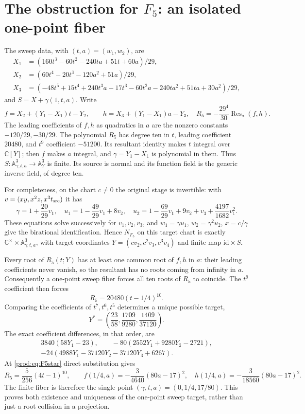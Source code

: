 \documentclass[11pt]{article}
\numberwithin{equation}{section}
\theoremstyle{plain}
\theoremstyle{definition}
\theoremstyle{remark}
\newcommand{\C}{\mathbb{C}}
\newcommand{\A}{\mathbb{A}}
\newcommand{\id}{\mathrm{id}}
\begin{document}
\section{The obstruction for \texorpdfstring{$F_5$}{F5}: an isolated one-point fiber}\label{prod:sec:F5}
The sweep data, with $(t,a)=(w_1,w_2)$, are
\begin{align*}
 X_1&=(160t^3-60t^2-240ta+51t+60a)/29,\\
 X_2&=(60t^4-20t^3-120a^2+51a)/29,\\
 X_3&=(-48t^5+15t^4+240t^3a-17t^3-60t^2a
       -240ta^2+51ta+30a^2)/29,
\end{align*}
and $S=X+\gamma(1,t,a)$. Write
\[
 f=X_2+(Y_1-X_1)t-Y_2,\qquad
 h=X_3+(Y_1-X_1)a-Y_3,
 \quad R_5=-\frac{29^4}{30}\operatorname{Res}_a(f,h).
\]
The leading coefficients of $f,h$ as quadratics in $a$ are the nonzero
constants $-120/29,-30/29$. The polynomial $R_5$ has degree ten in $t$,
leading coefficient $20480$, and $t^9$ coefficient $-51200$.
Its resultant identity makes $t$ integral over $\C[Y]$; then $f$ makes
$a$ integral, and $\gamma=Y_1-X_1$ is polynomial in them. Thus
$S:\A^3_{\gamma,t,a}\to\A^3_Y$ is finite. Its source is normal and its
function field is the generic inverse field, of degree ten.

For completeness, on the chart $c\ne0$ the original stage is invertible:
with $v=(xy,x^2z,x^3t_{\rm src})$ it has
\[
 \gamma=1+\frac{20}{29}v_1,\quad
 u_1=1-\frac{49}{29}v_1+8v_2,\quad
 u_2=1-\frac{69}{29}v_1+9v_2+v_3+\frac{4197}{1682}v_1^2.
\]
These equations solve successively for $v_1,v_2,v_3$, and
$w_1=\gamma u_1$, $w_2=\gamma^2u_2$, $x=c/\gamma$ give the birational
identification. Hence $N_{F_5}$ on this target chart is exactly
$\C^\times\times\A^3_{\gamma,t,a}$, with target coordinates
$Y=(cv_2,c^2v_3,c^3v_4)$ and finite map $\id\times S$.

Every root of $R_5(t;Y)$ has at least one common root of $f,h$ in $a$:
their leading coefficients never vanish, so the resultant has no roots
coming from infinity in $a$. Consequently a one-point sweep fiber forces
all ten roots of $R_5$ to coincide. The $t^9$ coefficient then forces
\[
 R_5=20480(t-1/4)^{10}.
\]
Comparing the coefficients of $t^7,t^6,t^5$ determines a unique possible
target,
\begin{equation}\label{prod:eq:F5star}
 Y^*=\left(\frac{23}{58},\frac{1709}{9280},\frac{1409}{37120}\right).
\end{equation}
The exact coefficient differences, in that order, are
\begin{align*}
 3840(58Y_1-23),\qquad
 -80(2552Y_1+9280Y_2-2721),\\
 -24(4988Y_1-37120Y_2-37120Y_3+6267).
\end{align*}
At \eqref{prod:eq:F5star} direct substitution gives
\[
 R_5=\frac5{256}(4t-1)^{10},\qquad
 f(1/4,a)=-\frac3{4640}(80a-17)^2,\quad
 h(1/4,a)=-\frac3{18560}(80a-17)^2.
\]
The finite fiber is therefore the single point
$(\gamma,t,a)=(0,1/4,17/80)$. This proves both existence and uniqueness
of the one-point sweep target, rather than just a root collision in a
projection.
\end{document}
